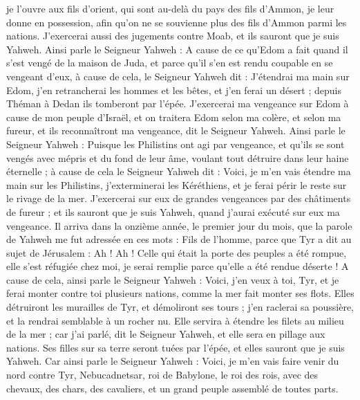 \begin{multicols}{2}
je l’ouvre aux fils d'orient, qui sont au-delà du pays des fils d’Ammon, je leur donne en possession, afin qu'on ne se souvienne plus des fils d’Ammon parmi les nations.
J'exercerai aussi des jugements contre Moab, et ils sauront que je suis Yahweh.
Ainsi parle le Seigneur Yahweh : A cause de ce qu'Edom a fait quand il s'est vengé de la maison de Juda, et parce qu'il s’en est rendu coupable en se vengeant d'eux,
à cause de cela, le Seigneur Yahweh dit : J'étendrai ma main sur Edom, j'en retrancherai les hommes et les bêtes, et j’en ferai un désert ; depuis Théman à Dedan ils tomberont par l'épée.
J'exercerai ma vengeance sur Edom à cause de mon peuple d'Israël, et on traitera Edom selon ma colère, et selon ma fureur, et ils reconnaîtront ma vengeance, dit le Seigneur Yahweh.
Ainsi parle le Seigneur Yahweh : Puisque les Philistins ont agi par vengeance, et qu'ils se sont vengés avec mépris et du fond de leur âme, voulant tout détruire dans leur haine éternelle ;
à cause de cela le Seigneur Yahweh dit : Voici, je m'en vais étendre ma main sur les Philistins, j'exterminerai les Kéréthiens, et je ferai périr le reste sur le rivage de la mer.
J’exercerai sur eux de grandes vengeances par des châtiments de fureur ; et ils sauront que je suis Yahweh, quand j'aurai exécuté sur eux ma vengeance.
\VerseOne{}Il arriva dans la onzième année, le premier jour du mois, que la parole de Yahweh me fut adressée en ces mots :
Fils de l’homme, parce que Tyr a dit au sujet de Jérusalem : Ah ! Ah ! Celle qui était la porte des peuples a été rompue, elle s'est réfugiée chez moi, je serai remplie parce qu'elle a été rendue déserte !
A cause de cela, ainsi parle le Seigneur Yahweh : Voici, j'en veux à toi, Tyr, et je ferai monter contre toi plusieurs nations, comme la mer fait monter ses flots.
Elles détruiront les murailles de Tyr, et démoliront ses tours ; j’en raclerai sa poussière, et la rendrai semblable à un rocher nu.
Elle servira à étendre les filets au milieu de la mer ; car j'ai parlé, dit le Seigneur Yahweh, et elle sera en pillage aux nations.
Ses filles sur sa terre seront tuées par l'épée, et elles sauront que je suis Yahweh.
Car ainsi parle le Seigneur Yahweh : Voici, je m'en vais faire venir du nord contre Tyr, Nebucadnetsar, roi de Babylone, le roi des rois, avec des chevaux, des chars, des cavaliers, et un grand peuple assemblé de toutes parts.

\end{multicols}

